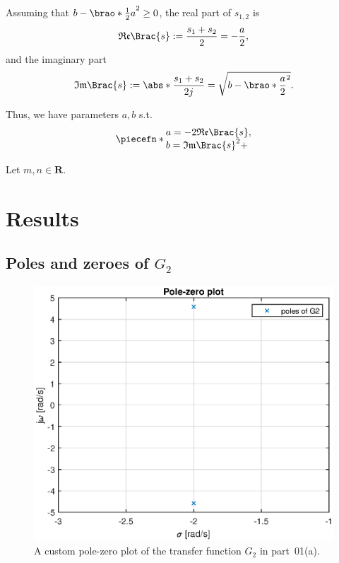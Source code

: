 \documentclass[12pt]{article}
\DeclarePairedDelimiter\brao()%
\DeclarePairedDelimiter\Brac\{\}%
\DeclarePairedDelimiter\abs||
\DeclarePairedDelimiter\piecefn\{.
\begin{document}
\begin{enumerate}[(a)]
        Assuming that ${b - \brao*{\frac{1}2 a}^2} \geq 0$,
        the real part of $s_{1,2}$ is
        \begin{equation}
            \mathfrak{Re}\Brac{s} := \frac{s_1 + s_2}2 = -\frac{a}2,
        \end{equation}
        and the imaginary part
        \begin{equation}
            \mathfrak{Im}\Brac{s} := \abs*{\frac{s_1 + s_2}{2j}} = \sqrt{b - \brao*{\frac{a}2}^2}.
        \end{equation}

        Thus, we have parameters $a,b$ s.t.
        \begin{equation}
            \piecefn*{
                \begin{array}{@{}l@{}}
                    a = -2 \mathfrak{Re}\Brac{s},
                \\*
                    b = \mathfrak{Im}\Brac{s}^2 + 
                \\*
                \end{array}
            }
        \end{equation}

        Let $m,n \in \mathbf{R}$. 
\end{enumerate}



\section{Results}

\subsection{Poles and zeroes of $G_2$}

\begin{figure}
    \centering
    \includegraphics[width=\linewidth]{img/part01a_pzplot.eps}
    \caption{A custom pole-zero plot of the transfer function $G_2$ in part~01(a).}
    \label{fig:pzplot_1a}
\end{figure}
\end{document}
